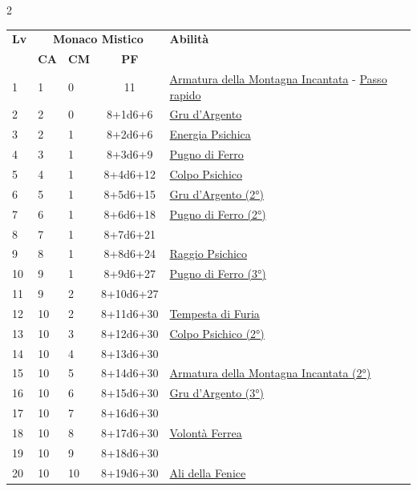 {\begin{multicols}{2}


\noindent\begin{tabularx}{\linewidth}{p{0.55cm}|p{0.55cm}p{0.55cm}c|X|}
	\toprule
 \rowcolor{gray!20}	\textbf{Lv} & \multicolumn{3}{c|}{\textbf{Monaco Mistico}} & \textbf{Abilità} \\
& \centering\arraybackslash \textbf{CA} & \centering\arraybackslash \textbf{CM} & \centering\arraybackslash \textbf{PF} & \\
	\toprule
	1 & 1 & 0 & 11 & \hyperlink{Armatura della Montagna Incantata}{Armatura della Montagna Incantata} - \hyperlink{Passo rapido}{Passo rapido}\\
	\rowcolor{gray!20}2 & 2 & 0 & 8+1d6+6 & \hyperlink{Gru d'Argento}{Gru d'Argento}\\
	3 & 2 & 1 & 8+2d6+6 & \hyperlink{Energia Psichica}{Energia Psichica}\\
	\rowcolor{gray!20}4 & 3 & 1 & 8+3d6+9 & \hyperlink{Pugno di Ferro}{Pugno di Ferro}\\
	5 & 4 & 1 & 8+4d6+12 & \hyperlink{Colpo Psichico}{Colpo Psichico}\\
	\rowcolor{gray!20}6 & 5 & 1 & 8+5d6+15 & \hyperlink{Gru d'Argento}{Gru d'Argento (2°)}\\
	7 & 6 & 1 & 8+6d6+18 & \hyperlink{Pugno di Ferro}{Pugno di Ferro (2°)}\\
	\rowcolor{gray!20}8 & 7 & 1 & 8+7d6+21 & \\
	9 & 8 & 1 & 8+8d6+24 & \hyperlink{Raggio Psichico}{Raggio Psichico}\\
	\rowcolor{gray!20}10 & 9 & 1 & 8+9d6+27 & \hyperlink{Pugno di Ferro}{Pugno di Ferro (3°)}\\
	11 & 9 & 2 & 8+10d6+27 & \\
	\rowcolor{gray!20}12 & 10 & 2 & 8+11d6+30 & \hyperlink{Tempesta di Furia}{Tempesta di Furia}\\
	13 & 10 & 3 & 8+12d6+30 & \hyperlink{Colpo Psichico}{Colpo Psichico (2°)}\\
	\rowcolor{gray!20}14 & 10 & 4 & 8+13d6+30 & \\
	15 & 10 & 5 & 8+14d6+30 & \hyperlink{Armatura della Montagna Incantata}{Armatura della Montagna Incantata (2°)}\\
	\rowcolor{gray!20}16 & 10 & 6 & 8+15d6+30 & \hyperlink{Gru d'Argento}{Gru d'Argento (3°)}\\
	17 & 10 & 7 & 8+16d6+30 & \\
	\rowcolor{gray!20}18 & 10 & 8 & 8+17d6+30 & \hyperlink{Volonta' Ferrea}{Volontà Ferrea}\\
	19 & 10 & 9 & 8+18d6+30 & \\
	\rowcolor{gray!20}20 & 10 & 10 & 8+19d6+30 & \hyperlink{Ali della Fenice}{Ali della Fenice}\\
\end{tabularx}


\end{multicols}}
